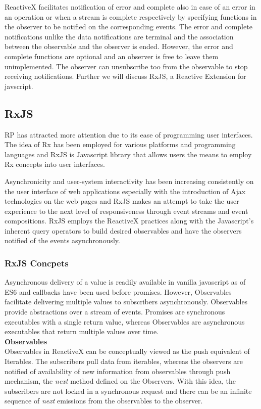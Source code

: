 ReactiveX facilitates notification of error and complete also in case of an error in an operation or when a stream is complete respectively by specifying functions in the observer to be notified on the corresponding events. The error and complete notifications unlike the data notifications are terminal and the association between the observable and the observer is ended. However, the error and complete functions are optional and an observer is free to leave them unimplemented. The observer can unsubscribe too from the observable to stop receiving notifications. Further we will discuss RxJS, a Reactive Extension for javscript.

\subsection{RxJS}
RP has attracted more attention due to its ease of programming user interfaces\cite{Schuster:2016:RPR:2892664.2892666}\cite{Bainomugisha:2013:SRP:2501654.2501666}. The idea of Rx has been employed for various platforms and programming languages and RxJS is Javascript library that allows users the means to employ Rx concepts into user interfaces. 

Asynchronicity and user-system interactivity \cite{Kristaly:2008:WTW:1389586.1389663} has been increasing consistently on the user interface of web applications especially with the introduction of Ajax technologies\cite{ajaxANewWayToWP} on the web pages and RxJS makes an attempt to take the user experience to the next level of responsiveness through event streams and event compositions. RxJS employs the ReactiveX practices along with the Javascript's inherent query operators to build desired observables and have the observers notified of the events asynchronously.

\subsubsection{RxJS Concpets}
Asynchronous delivery of a value is readily available in vanilla javascript as of ES6\cite{ECMAScript} and callbacks have been used before promises. However, Observables\cite{observable} facilitate delivering multiple values to subscribers asynchronously. Observables provide abstractions over a stream of events. Promises are synchronous executables with a single return value, whereas Observables are asynchronous executables that return multiple values over time. 
\\
\textbf{Observables}
\\
Observables in ReactiveX can be conceptually viewed as the push equivalent of Iterables\cite{reactiveX}. The subscribers pull data from iterables, whereas the observers are notified of availability of new information from observables through push mechanism, the \textit{next} method defined on the Observers. With this idea, the subscribers are not locked in a synchronous request and there can be an infinite sequence of \textit{next} emissions from the observables to the observer.

